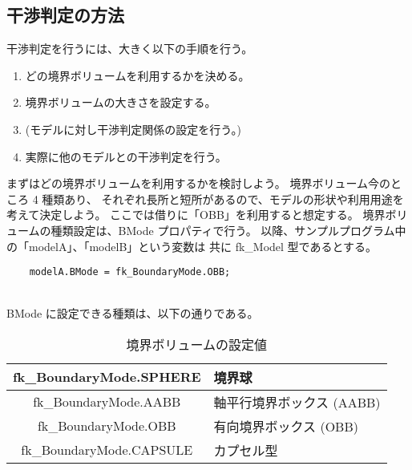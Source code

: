 \subsection{干渉判定の方法}
干渉判定を行うには、大きく以下の手順を行う。
\begin{enumerate}
 \item どの境界ボリュームを利用するかを決める。
 \item 境界ボリュームの大きさを設定する。
 \item (モデルに対し干渉判定関係の設定を行う。)
 \item 実際に他のモデルとの干渉判定を行う。
\end{enumerate}
まずはどの境界ボリュームを利用するかを検討しよう。
境界ボリューム今のところ 4 種類あり、
それぞれ長所と短所があるので、モデルの形状や利用用途を考えて決定しよう。
ここでは借りに「OBB」を利用すると想定する。
境界ボリュームの種類設定は、BMode プロパティで行う。
以降、サンプルプログラム中の「modelA」、「modelB」という変数は
共に fk\_Model 型であるとする。
\\
\begin{breakbox}
\begin{verbatim}
    modelA.BMode = fk_BoundaryMode.OBB;
\end{verbatim}
\end{breakbox}
~ \\
BMode に設定できる種類は、以下の通りである。
\begin{table}[H]
\caption{境界ボリュームの設定値}
\label{tbl:bmode}
\begin{center}
\begin{tabular}{|c|l|}
\hline
fk\_BoundaryMode.SPHERE & 境界球 \\ \hline
fk\_BoundaryMode.AABB & 軸平行境界ボックス (AABB) \\ \hline
fk\_BoundaryMode.OBB & 有向境界ボックス (OBB) \\ \hline
fk\_BoundaryMode.CAPSULE & カプセル型 \\ \hline
\end{tabular}
\end{center}
\end{table}

